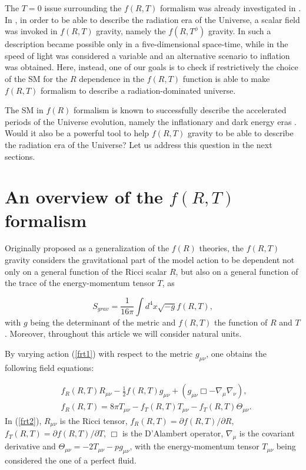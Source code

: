 The $T=0$ issue surrounding the $f(R,T)$ formalism was already investigated
in \cite{ms/2016,moraes/2014,moraes/2016,baffou/2015,sun/2016}. In \cite%
{ms/2016}, in order to be able to describe the radiation era of the
Universe, a scalar field was invoked in $f(R,T)$ gravity, namely the $%
f(R,T^{\phi})$ gravity. In \cite{moraes/2014} such a description became
possible only in a five-dimensional space-time, while in \cite{moraes/2016}
the speed of light was considered a variable and an alternative scenario to
inflation was obtained. Here, instead, one of our goals is to check if
restrictively the choice of the SM for the $R$ dependence in the $f(R,T)$
function is able to make $f(R,T)$ formalism to describe a
radiation-dominated universe.

The SM in $f(R)$ formalism is known to successfully describe the accelerated
periods of the Universe evolution, namely the inflationary and dark energy
eras \cite%
{starobinsky/2007,kaneda/2016,sebastiani/2015,farakos/2013,ellis/2013,appleby/2010}%
. Would it also be a powerful tool to help $f(R,T)$ gravity to be able to
describe the radiation era of the Universe? Let us address this question in
the next sections.

\section{An overview of the $f(R,T)$ formalism}

\label{sec:frt}

Originally proposed as a generalization of the $f(R)$ theories, the $f(R,T)$
gravity considers the gravitational part of the model action to be dependent
not only on a general function of the Ricci scalar $R$, but also on a
general function of the trace of the energy-momentum tensor $T$, as

\begin{equation}  \label{frt1}
S_{grav}=\frac{1}{16\pi}\int d^{4}x\sqrt{-g}f(R,T),
\end{equation}
with $g$ being the determinant of the metric and $f(R,T)$ the function of $R$
and $T$. Moreover, throughout this article we will consider natural units.

By varying action (\ref{frt1}) with respect to the metric $g_{\mu\nu}$, one
obtains the following field equations:

\begin{align}
& f_{R}(R,T)R_{\mu \nu }-\frac{1}{2}f(R,T)g_{\mu \nu }+(g_{\mu \nu }\Box
-\nabla _{\mu }\nabla _{\nu }),  \label{frt2} \\
& f_{R}(R,T)=8\pi T_{\mu \nu }-f_{T}(R,T)T_{\mu \nu }-f_{T}(R,T)\Theta _{\mu
\nu }.
\end{align}%
In (\ref{frt2}), $R_{\mu \nu }$ is the Ricci tensor, $f_{R}(R,T)=\partial
f(R,T)/\partial R$, $f_{T}(R,T)=\partial f(R,T)/\partial T$, $\Box $ is the
D'Alambert operator, $\nabla _{\mu }$ is the covariant derivative and $%
\Theta _{\mu \nu }=-2T_{\mu \nu }-pg_{\mu \nu }$, with the energy-momentum
tensor $T_{\mu \nu }$ being considered the one of a perfect fluid.

